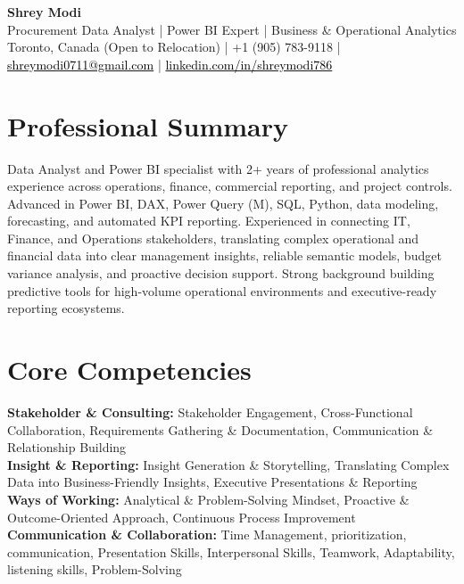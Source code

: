\documentclass[10.5pt,letterpaper]{article}
\begin{document}
\begin{center}
  {\Huge \bfseries \color{accent} Shrey Modi}\\[0.3em]
  {\normalsize Procurement Data Analyst | Power BI Expert | Business \& Operational Analytics}\\[0.1em]
  {\small Toronto, Canada (Open to Relocation) | +1 (905) 783-9118 | \href{mailto:shreymodi0711@gmail.com}{\textcolor{black}{shreymodi0711@gmail.com}} | \href{https://linkedin.com/in/shreymodi786}{\textcolor{black}{linkedin.com/in/shreymodi786}}}
\end{center}
\vspace{-12pt}

\section{Professional Summary}
\noindent Data Analyst and Power BI specialist with 2+ years of professional analytics experience across operations, finance, commercial reporting, and project controls. Advanced in Power BI, DAX, Power Query (M), SQL, Python, data modeling, forecasting, and automated KPI reporting. Experienced in connecting IT, Finance, and Operations stakeholders, translating complex operational and financial data into clear management insights, reliable semantic models, budget variance analysis, and proactive decision support. Strong background building predictive tools for high-volume operational environments and executive-ready reporting ecosystems.


\section{Core Competencies}
\noindent
\textbf{Stakeholder \& Consulting:} Stakeholder Engagement, Cross-Functional Collaboration, Requirements Gathering \& Documentation, Communication \& Relationship Building\\\textbf{Insight \& Reporting:} Insight Generation \& Storytelling, Translating Complex Data into Business-Friendly Insights, Executive Presentations \& Reporting\\\textbf{Ways of Working:} Analytical \& Problem-Solving Mindset, Proactive \& Outcome-Oriented Approach, Continuous Process Improvement\\\textbf{Communication \& Collaboration:} Time Management, prioritization, communication, Presentation Skills, Interpersonal Skills, Teamwork, Adaptability, listening skills, Problem-Solving
\end{document}
